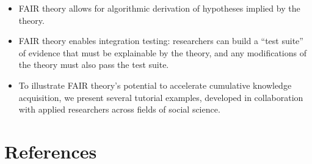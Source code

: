 \documentclass[
  man]{apa6}
\begin{document}
\begin{itemize}
\item
  FAIR theory allows for algorithmic derivation of hypotheses implied by the theory.
\item
  FAIR theory enables integration testing: researchers can build a ``test suite'' of evidence that must be explainable by the theory, and any modifications of the theory must also pass the test suite.
\item
  To illustrate FAIR theory's potential to accelerate cumulative knowledge acquisition, we present several tutorial examples, developed in collaboration with applied researchers across fields of social science.
\end{itemize}

\newpage

\section{References}\label{references}
\end{document}
